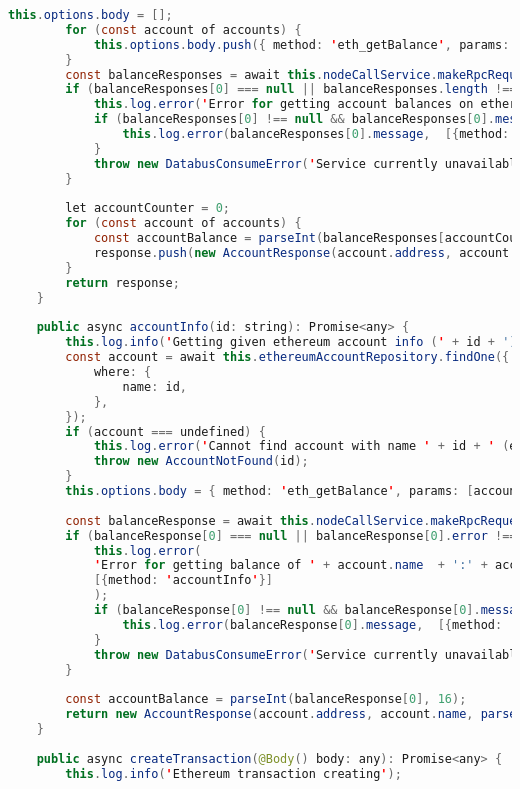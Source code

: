\begin{lstlisting}[language=java]
		this.options.body = [];
		for (const account of accounts) {
			this.options.body.push({ method: 'eth_getBalance', params: [account.address, 'latest'], id: '777' });
		}
		const balanceResponses = await this.nodeCallService.makeRpcRequest(this.options);
		if (balanceResponses[0] === null || balanceResponses.length !== 0 && balanceResponses[0].error !== undefined) {
			this.log.error('Error for getting account balances on ethereum was fault', [{method: 'listAccounts'}]);
			if (balanceResponses[0] !== null && balanceResponses[0].message !== undefined) {
				this.log.error(balanceResponses[0].message,  [{method: 'listAccounts'}]);
			}
			throw new DatabusConsumeError('Service currently unavailable');
		}
		
		let accountCounter = 0;
		for (const account of accounts) {
			const accountBalance = parseInt(balanceResponses[accountCounter++], 16);
			response.push(new AccountResponse(account.address, account.name, parseFloat(this.web3.fromWei(accountBalance, 'ether').toString()), 'ethereum'));
		}
		return response;
	}
	
	public async accountInfo(id: string): Promise<any> {
		this.log.info('Getting given ethereum account info (' + id + ')');
		const account = await this.ethereumAccountRepository.findOne({
			where: {
				name: id,
			},
		});
		if (account === undefined) {
			this.log.error('Cannot find account with name ' + id + ' (ethereum)', [{method: 'accountInfo'}]);
			throw new AccountNotFound(id);
		}
		this.options.body = { method: 'eth_getBalance', params: [account.address, 'latest'], id: '777' };
		
		const balanceResponse = await this.nodeCallService.makeRpcRequest(this.options);
		if (balanceResponse[0] === null || balanceResponse[0].error !== undefined) {
			this.log.error(
			'Error for getting balance of ' + account.name  + ':' + account.address + ' on ethereum',
			[{method: 'accountInfo'}]
			);
			if (balanceResponse[0] !== null && balanceResponse[0].message !== undefined) {
				this.log.error(balanceResponse[0].message,  [{method: 'accountInfo'}]);
			}
			throw new DatabusConsumeError('Service currently unavailable');
		}
		
		const accountBalance = parseInt(balanceResponse[0], 16);
		return new AccountResponse(account.address, account.name, parseFloat(this.web3.fromWei(accountBalance, 'ether').toString()), 'ethereum' );
	}
	
	public async createTransaction(@Body() body: any): Promise<any> {
		this.log.info('Ethereum transaction creating');
		

\end{lstlisting}
